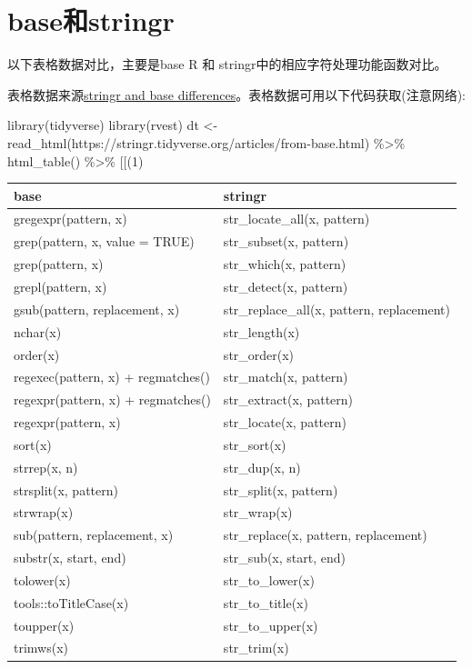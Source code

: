 \documentclass[
]{book}
\newenvironment{Shaded}{\begin{snugshade}}{\end{snugshade}}
\newcommand{\AttributeTok}[1]{\textcolor[rgb]{0.77,0.63,0.00}{#1}}
\newcommand{\DecValTok}[1]{\textcolor[rgb]{0.00,0.00,0.81}{#1}}
\newcommand{\FunctionTok}[1]{\textcolor[rgb]{0.00,0.00,0.00}{#1}}
\newcommand{\NormalTok}[1]{#1}
\newcommand{\OtherTok}[1]{\textcolor[rgb]{0.56,0.35,0.01}{#1}}
\newcommand{\SpecialCharTok}[1]{\textcolor[rgb]{0.00,0.00,0.00}{#1}}
\newcommand{\StringTok}[1]{\textcolor[rgb]{0.31,0.60,0.02}{#1}}
\begin{document}
\hypertarget{baseux548cstringr}{%
\section{base和stringr}\label{baseux548cstringr}}

以下表格数据对比，主要是base R 和 stringr中的相应字符处理功能函数对比。

表格数据来源\href{https://stringr.tidyverse.org/articles/from-base.html}{stringr and base differences}。表格数据可用以下代码获取(注意网络):

\begin{Shaded}
\begin{Highlighting}[]
\FunctionTok{library}\NormalTok{(tidyverse)}
\FunctionTok{library}\NormalTok{(rvest)}
\NormalTok{dt }\OtherTok{\textless{}{-}} \FunctionTok{read\_html}\NormalTok{(}\StringTok{\textquotesingle{}https://stringr.tidyverse.org/articles/from{-}base.html\textquotesingle{}}\NormalTok{) }\SpecialCharTok{\%\textgreater{}\%} 
   \FunctionTok{html\_table}\NormalTok{() }\SpecialCharTok{\%\textgreater{}\%} \StringTok{\textasciigrave{}}\AttributeTok{[[}\StringTok{\textasciigrave{}}\NormalTok{(}\DecValTok{1}\NormalTok{)}
\end{Highlighting}
\end{Shaded}

\begin{longtable}[]{@{}ll@{}}
\toprule
base & stringr \\
\midrule
\endhead
gregexpr(pattern, x) & str\_locate\_all(x, pattern) \\
grep(pattern, x, value = TRUE) & str\_subset(x, pattern) \\
grep(pattern, x) & str\_which(x, pattern) \\
grepl(pattern, x) & str\_detect(x, pattern) \\
gsub(pattern, replacement, x) & str\_replace\_all(x, pattern, replacement) \\
nchar(x) & str\_length(x) \\
order(x) & str\_order(x) \\
regexec(pattern, x) + regmatches() & str\_match(x, pattern) \\
regexpr(pattern, x) + regmatches() & str\_extract(x, pattern) \\
regexpr(pattern, x) & str\_locate(x, pattern) \\
sort(x) & str\_sort(x) \\
strrep(x, n) & str\_dup(x, n) \\
strsplit(x, pattern) & str\_split(x, pattern) \\
strwrap(x) & str\_wrap(x) \\
sub(pattern, replacement, x) & str\_replace(x, pattern, replacement) \\
substr(x, start, end) & str\_sub(x, start, end) \\
tolower(x) & str\_to\_lower(x) \\
tools::toTitleCase(x) & str\_to\_title(x) \\
toupper(x) & str\_to\_upper(x) \\
trimws(x) & str\_trim(x) \\
\bottomrule
\end{longtable}
\end{document}
